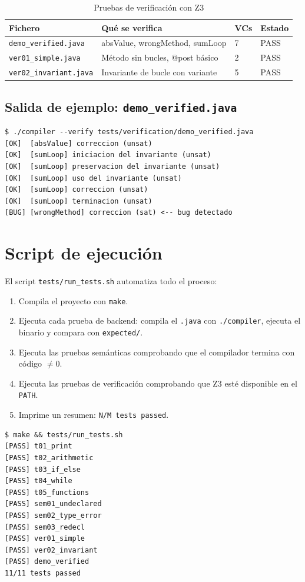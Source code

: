 \begin{table}[H]
  \centering
  \caption{Pruebas de verificación con Z3}
  \label{tab:verif}
  \begin{tabular}{lp{5.5cm}ll}
    \toprule
    \textbf{Fichero}               & \textbf{Qué se verifica}  & \textbf{VCs} & \textbf{Estado} \\
    \midrule
    \texttt{demo\_verified.java}   & absValue, wrongMethod, sumLoop & 7 & PASS \\
    \texttt{ver01\_simple.java}    & Método sin bucles, @post básico & 2 & PASS \\
    \texttt{ver02\_invariant.java} & Invariante de bucle con variante & 5 & PASS \\
    \bottomrule
  \end{tabular}
\end{table}

\subsection{Salida de ejemplo: \texttt{demo\_verified.java}}

\begin{verbatim}
$ ./compiler --verify tests/verification/demo_verified.java
[OK]  [absValue] correccion (unsat)
[OK]  [sumLoop] iniciacion del invariante (unsat)
[OK]  [sumLoop] preservacion del invariante (unsat)
[OK]  [sumLoop] uso del invariante (unsat)
[OK]  [sumLoop] correccion (unsat)
[OK]  [sumLoop] terminacion (unsat)
[BUG] [wrongMethod] correccion (sat) <-- bug detectado
\end{verbatim}

\section{Script de ejecución}

El script \texttt{tests/run\_tests.sh} automatiza todo el proceso:

\begin{enumerate}
  \item Compila el proyecto con \texttt{make}.
  \item Ejecuta cada prueba de backend: compila el \texttt{.java} con
    \texttt{./compiler}, ejecuta el binario y compara con
    \texttt{expected/}.
  \item Ejecuta las pruebas semánticas comprobando que el compilador
    termina con código $\neq 0$.
  \item Ejecuta las pruebas de verificación comprobando que Z3 esté
    disponible en el \texttt{PATH}.
  \item Imprime un resumen: \texttt{N/M tests passed}.
\end{enumerate}

\begin{verbatim}
$ make && tests/run_tests.sh
[PASS] t01_print
[PASS] t02_arithmetic
[PASS] t03_if_else
[PASS] t04_while
[PASS] t05_functions
[PASS] sem01_undeclared
[PASS] sem02_type_error
[PASS] sem03_redecl
[PASS] ver01_simple
[PASS] ver02_invariant
[PASS] demo_verified
11/11 tests passed
\end{verbatim}
